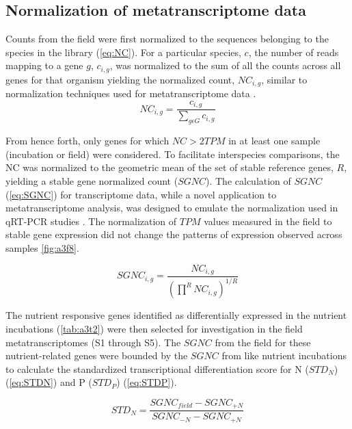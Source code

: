 \subsection{Normalization of metatranscriptome data}

Counts from the field were first normalized to the sequences belonging to the species in the library (\cref{eq:NC}). For a particular species, $c$, the number of reads mapping to a gene $g$, $c_{i,g}$, was normalized to the sum of all the counts across all genes for that organism yielding the normalized count, $NC_{i,g}$, similar to normalization techniques used for metatranscriptome data \citep{Marchetti2012a, Ottesen2011}. 
\begin{equation}
	\label{eq:NC}
	NC_{i,g} = \frac{c_{i,g}}{\sum \limits_{g \epsilon G} c_{i,g}}
\end{equation}

From hence forth, only genes for which $NC > 2 TPM$ in at least one sample (incubation or field) were considered. To facilitate interspecies comparisons, the NC was normalized to the geometric mean of the set of stable reference genes, $R$, yielding a stable gene normalized count ($SGNC$). The calculation of $SGNC$ (\cref{eq:SGNC}) for transcriptome data, while a novel application to metatranscriptome analysis, was designed to emulate the normalization used in qRT-PCR studies \citep{Vandesompele2002}. The normalization of $TPM$ values measured in the field to stable gene expression did not change the patterns of expression observed across samples \cref{fig:a3f8}. \par
\begin{equation}
	\label{eq:SGNC}
 	SGNC_{i,g}=\frac{NC_{i,g}}{\left ( \prod \limits^{R} NC_{i,g} \right ) ^{1/R}}
\end{equation}

The nutrient responsive genes identified as differentially expressed in the nutrient incubations (\cref{tab:a3t2}) were then selected for investigation in the field metatranscriptomes (S1 through S5). The $SGNC$ from the field for these nutrient-related genes were bounded by the $SGNC$ from like nutrient incubations to calculate the standardized transcriptional differentiation score for N ($STD_N$) (\cref{eq:STDN}) and P ($STD_P$) (\cref{eq:STDP}).\par 

\begin{equation}
	\label{eq:STDN}
	STD_N = \frac{SGNC_{field} - SGNC_{+N}}{SGNC_{-N} - SGNC_{+N}} 	
\end{equation}

